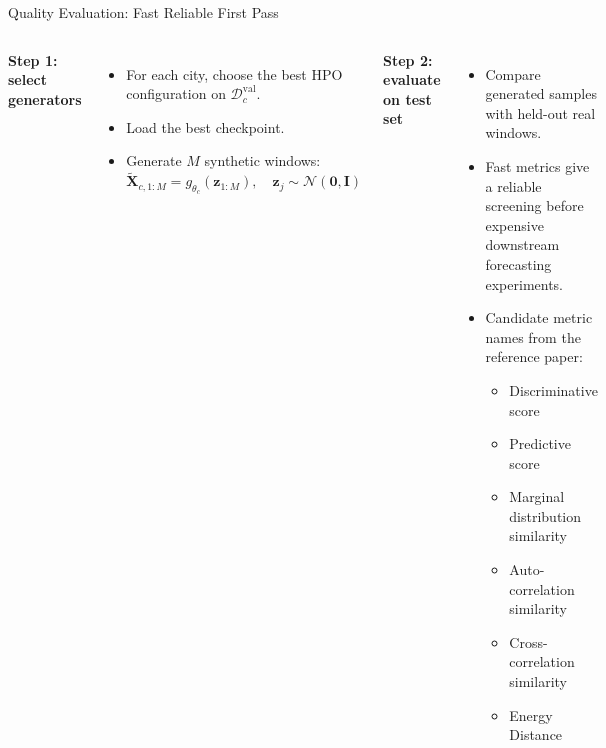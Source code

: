 \documentclass[aspectratio=169,10pt]{beamer}
\begin{document}
\begin{frame}{Quality Evaluation: Fast Reliable First Pass}
  \begin{columns}[T]
      \textbf{Step 1: select generators}
      \begin{itemize}
        \item For each city, choose the best HPO configuration on
              $\mathcal{D}^{\mathrm{val}}_c$.
        \item Load the best checkpoint.
        \item Generate $M$ synthetic windows:
          \[
            \tilde{\mathbf{X}}_{c,1:M}
            =
            g_{\theta_c}
            \left(
              \mathbf{z}_{1:M}
            \right),
            \quad
            \mathbf{z}_j\sim\mathcal{N}(\mathbf{0},\mathbf{I})
          \]
      \end{itemize}

      \textbf{Step 2: evaluate on test set}
      \begin{itemize}
        \item Compare generated samples with held-out real windows.
        \item Fast metrics give a reliable screening before expensive
              downstream forecasting experiments.
        \item Candidate metric names from the reference paper:
          \begin{itemize}
            \item Discriminative score
            \item Predictive score
            \item Marginal distribution similarity
            \item Auto-correlation similarity
            \item Cross-correlation similarity
            \item Energy Distance
          \end{itemize}
      \end{itemize}
  \end{columns}
\end{frame}
\end{document}
